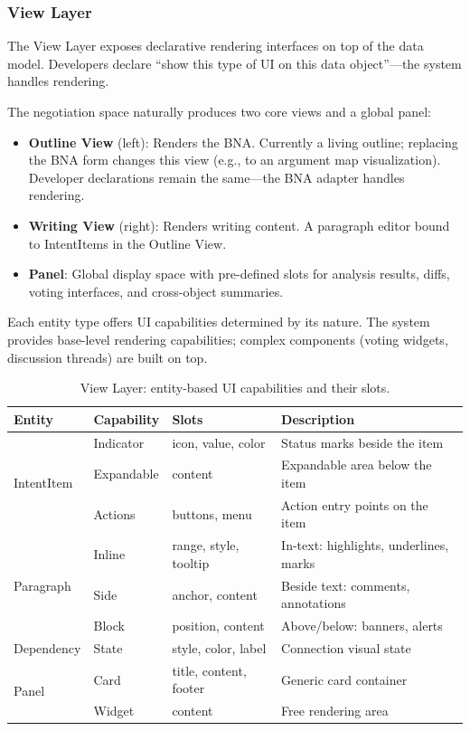\subsubsection{View Layer}
\label{sec:view-layer}

The View Layer exposes declarative rendering interfaces on top of the data model. Developers declare ``show this type of UI on this data object''---the system handles rendering.

The negotiation space naturally produces two core views and a global panel:

\begin{itemize}[leftmargin=1.5em, itemsep=1pt]
\item \textbf{Outline View} (left): Renders the BNA. Currently a living outline; replacing the BNA form changes this view (e.g., to an argument map visualization). Developer declarations remain the same---the BNA adapter handles rendering.
\item \textbf{Writing View} (right): Renders writing content. A paragraph editor bound to IntentItems in the Outline View.
\item \textbf{Panel}: Global display space with pre-defined slots for analysis results, diffs, voting interfaces, and cross-object summaries.
\end{itemize}

Each entity type offers UI capabilities determined by its nature. The system provides base-level rendering capabilities; complex components (voting widgets, discussion threads) are built on top.

\begin{table}[t]
\small
\caption{View Layer: entity-based UI capabilities and their slots.}
\label{tab:view-layer}
\begin{tabular}{@{}llp{2cm}p{3.5cm}@{}}
\toprule
\textbf{Entity} & \textbf{Capability} & \textbf{Slots} & \textbf{Description} \\
\midrule
\multirow{3}{*}{IntentItem} & Indicator & icon, value, color & Status marks beside the item \\
& Expandable & content & Expandable area below the item \\
& Actions & buttons, menu & Action entry points on the item \\
\midrule
\multirow{3}{*}{Paragraph} & Inline & range, style, tooltip & In-text: highlights, underlines, marks \\
& Side & anchor, content & Beside text: comments, annotations \\
& Block & position, content & Above/below: banners, alerts \\
\midrule
Dependency & State & style, color, label & Connection visual state \\
\midrule
\multirow{2}{*}{Panel} & Card & title, content, footer & Generic card container \\
& Widget & content & Free rendering area \\
\bottomrule
\end{tabular}
\end{table}

